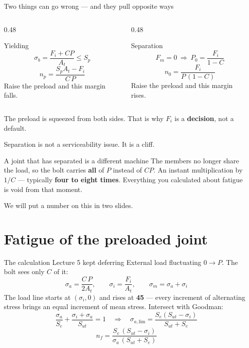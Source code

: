 \documentclass[aspectratio=169,10pt]{beamer}
\begin{document}
\begin{frame}{Two things can go wrong --- and they pull opposite ways}
\begin{columns}[T]
\begin{column}{0.48\textwidth}
\begin{block}{Yielding}
\[ \sigma_b=\frac{F_i+CP}{A_t}\le S_p \]
\[ n_p=\frac{S_pA_t-F_i}{C\,P} \]
\vspace{-4pt}
Raise the preload and this margin \alert{falls}.
\end{block}
\end{column}
\begin{column}{0.48\textwidth}
\begin{block}{Separation}
\[ F_m=0 \ \Rightarrow\ P_0=\frac{F_i}{1-C} \]
\[ n_0=\frac{F_i}{P\,(1-C)} \]
\vspace{-4pt}
Raise the preload and this margin \alert{rises}.
\end{block}
\end{column}
\end{columns}
\vfill
\centering
The preload is squeezed from both sides. That is why $F_i$ is a \textbf{decision}, not a default.
\end{frame}

\begin{frame}{Separation is not a serviceability issue. It is a cliff.}
\begin{alertblock}{A joint that has separated is a different machine}
The members no longer share the load, so the bolt carries \textbf{all} of $P$ instead of $CP$.
\vspace{3pt}
An instant multiplication by $1/C$ --- typically \textbf{four to eight times}.
\vspace{3pt}
Everything you calculated about fatigue is void from that moment.
\end{alertblock}
\vfill
\centering
\large We will put a number on this in two slides.
\end{frame}

\section{Fatigue of the preloaded joint}

\begin{frame}{The calculation Lecture 5 kept deferring}
External load fluctuating $0 \to P$. The bolt sees only $C$ of it:
\[
\sigma_a=\frac{C\,P}{2A_t},\qquad \sigma_i=\frac{F_i}{A_t},\qquad \sigma_m=\sigma_a+\sigma_i
\]
\vfill
The load line starts at $(\sigma_i,0)$ and rises at \textbf{45\textdegree} --- every increment of
alternating stress brings an equal increment of mean stress. Intersect with Goodman:
\[
\frac{\sigma_a}{S_e}+\frac{\sigma_i+\sigma_a}{S_{ut}}=1
\quad\Longrightarrow\quad
\sigma_{a,\text{lim}}=\frac{S_e(S_{ut}-\sigma_i)}{S_{ut}+S_e}
\]
\vfill
\centering
\[
n_f=\frac{S_e\,(S_{ut}-\sigma_i)}{\sigma_a\,(S_{ut}+S_e)}
\]
\end{frame}
\end{document}
